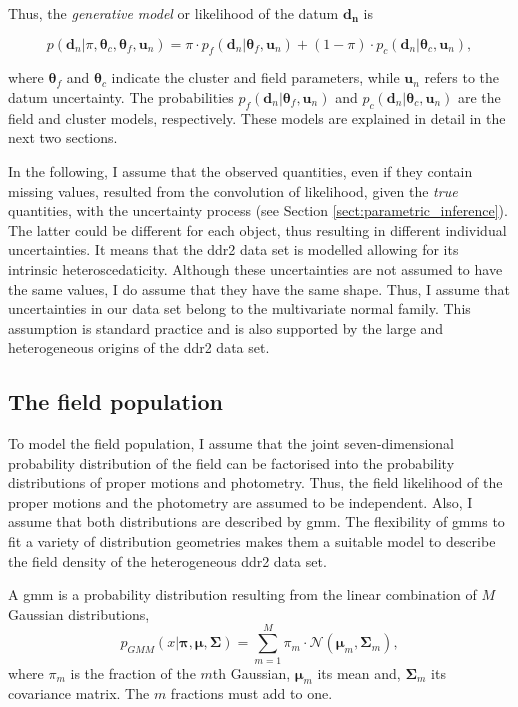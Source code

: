 Thus, the \emph{generative model} or likelihood of the datum $\mathbf{d_n}$  is

\begin{equation}
\label{eq:genmod}
p(\mathbf{d}_n | \pi,\boldsymbol{\theta}_c,\boldsymbol{\theta}_f,\mathbf{u}_n)=\pi \cdot p_f(\mathbf{d}_n|\boldsymbol{\theta}_f,\mathbf{u}_n) + (1-\pi)\cdot p_c(\mathbf{d}_n| \boldsymbol{\theta}_c,\mathbf{u}_n),
\end{equation}

where $\boldsymbol{\theta}_f$ and $\boldsymbol{\theta}_c$ indicate the cluster and field parameters, while $\mathbf{u}_n$ refers to the datum uncertainty. The probabilities $p_f(\mathbf{d}_n|\boldsymbol{\theta}_f,\mathbf{u}_n)$ and $p_c(\mathbf{d}_n| \boldsymbol{\theta}_c,\mathbf{u}_n)$ are the field and cluster models, respectively. These models are explained in detail in the next two sections.

In the following, I assume that the observed quantities, even if they contain missing values, resulted from the convolution of likelihood, given the \emph{true} quantities, with the uncertainty process (see Section \ref{sect:parametric_inference}). The latter could be different for each object, thus resulting in different individual uncertainties. It means that the \gls{ddr2} data set is modelled allowing for its intrinsic heteroscedaticity. Although these uncertainties are not assumed to have the same values, I do assume that they have the same shape. Thus, I assume that uncertainties in our data set belong to the multivariate normal family.  This assumption is standard practice and is also supported by the large and heterogeneous origins of the \gls{ddr2} data set. 

\subsection{The field population}
\label{sect:field_population}
To model the field population, I assume that the joint seven-dimensional probability distribution of the field can be factorised into the probability distributions of proper motions and photometry. Thus, the field likelihood of the proper motions and the photometry are assumed to be independent. Also, I assume that both distributions are described by \gls{gmm}. The flexibility of \glspl{gmm} to fit a variety of distribution geometries makes them a suitable model to describe the field density of the heterogeneous \gls{ddr2} data set. 

A \gls{gmm} is a probability distribution resulting from the linear combination of $M$ Gaussian distributions, 
\begin{equation}
p_{GMM}(x|\boldsymbol{\pi},\boldsymbol{\mu},\boldsymbol{\Sigma})=\sum_{m=1}^M \pi_m \cdot \mathcal{N}(\boldsymbol{\mu}_m,\boldsymbol{\Sigma}_m),
\end{equation}
{where $\pi_m$ is the fraction of the $m$th Gaussian, $\boldsymbol{\mu}_m$ its mean and, $\boldsymbol{\Sigma}_m$ its covariance matrix. The $m$ fractions must add to one. }

